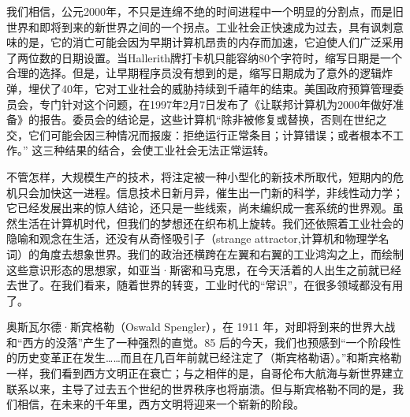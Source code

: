 我们相信，公元2000年，不只是连绵不绝的时间进程中一个明显的分割点，而是旧世界和即将到来的新世界之间的一个拐点。工业社会正快速成为过去，具有讽刺意味的是，它的消亡可能会因为早期计算机昂贵的内存而加速，它迫使人们广泛采用了两位数的日期设置。当Hallerith牌打卡机只能容纳80个字符时，缩写日期是一个合理的选择。但是，让早期程序员没有想到的是，缩写日期成为了意外的逻辑炸弹，埋伏了40年，它对工业社会的威胁持续到千禧年的结束。美国政府预算管理委员会，专门针对这个问题，在1997年2月7日发布了《让联邦计算机为2000年做好准备》的报告。委员会的结论是，这些计算机“除非被修复或替换，否则在世纪之交，它们可能会因三种情况而报废：拒绝运行正常条目；计算错误；或者根本不工作。” 这三种结果的结合，会使工业社会无法正常运转。


不管怎样，大规模生产的技术，将注定被一种小型化的新技术所取代，短期内的危机只会加快这一进程。信息技术日新月异，催生出一门新的科学，非线性动力学；它已经发展出来的惊人结论，还只是一些线索，尚未编织成一套系统的世界观。虽然生活在计算机时代，但我们的梦想还在织布机上旋转。我们还依照着工业社会的隐喻和观念在生活，还没有从奇怪吸引子（strange attractor,计算机和物理学名词）的角度去想象世界。我们的政治还横跨在左翼和右翼的工业鸿沟之上，而绘制这些意识形态的思想家，如亚当·斯密和马克思，在今天活着的人出生之前就已经去世了。在我们看来，随着世界的转变，工业时代的“常识”，在很多领域都没有用了。


奥斯瓦尔德·斯宾格勒（Oswald Spengler），在 1911 年，对即将到来的世界大战和“西方的没落”产生了一种强烈的直觉。85 后的今天，我们也预感到“一个阶段性的历史变革正在发生……而且在几百年前就已经注定了（斯宾格勒语）。”和斯宾格勒一样，我们看到西方文明正在衰亡；与之相伴的是，自哥伦布大航海与新世界建立联系以来，主导了过去五个世纪的世界秩序也将崩溃。但与斯宾格勒不同的是，我们相信，在未来的千年里，西方文明将迎来一个崭新的阶段。